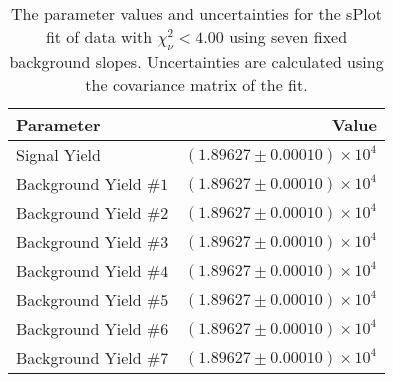 
\begin{table}[h]
    \begin{center}
        \begin{tabular}{lr}\toprule
            Parameter & Value \\\midrule
            Signal Yield & $(1.89627 \pm 0.00010) \times 10^{4}$ \\
            Background Yield $\#1$ & $(1.89627 \pm 0.00010) \times 10^{4}$ \\
            Background Yield $\#2$ & $(1.89627 \pm 0.00010) \times 10^{4}$ \\
            Background Yield $\#3$ & $(1.89627 \pm 0.00010) \times 10^{4}$ \\
            Background Yield $\#4$ & $(1.89627 \pm 0.00010) \times 10^{4}$ \\
            Background Yield $\#5$ & $(1.89627 \pm 0.00010) \times 10^{4}$ \\
            Background Yield $\#6$ & $(1.89627 \pm 0.00010) \times 10^{4}$ \\
            Background Yield $\#7$ & $(1.89627 \pm 0.00010) \times 10^{4}$ \\\bottomrule
        \end{tabular}
        \caption{The parameter values and uncertainties for the sPlot fit of data with $\chi^2_\nu < 4.00$ using seven fixed background slopes. Uncertainties are calculated using the covariance matrix of the fit.}
    \end{center}
\end{table}
